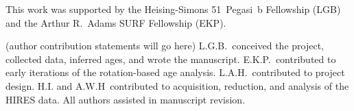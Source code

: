 \documentclass[11pt,twocolumn,tighten]{aastex63}
\begin{document}
\acknowledgements
This work was supported by the Heising-Simons 51~Pegasi~b Fellowship
(LGB)
and the Arthur R.~Adams SURF Fellowship (EKP).

(author contribution statements will go here)
L.G.B.~conceived the project, collected data, 
inferred ages, and wrote the manuscript.
E.K.P.~contributed to early iterations of the rotation-based age analysis.
L.A.H.~contributed to project design.
H.I. and A.W.H~contributed to acquisition, reduction, and analysis of
the HIRES data.
All authors assisted in manuscript revision.




\end{document}

